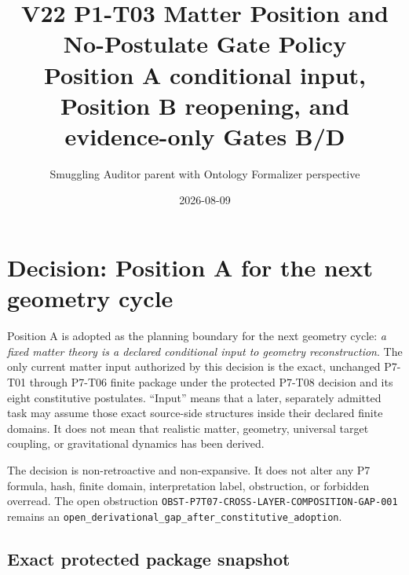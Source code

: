 \documentclass[11pt]{article}
\title{V22 P1-T03 Matter Position and No-Postulate Gate Policy\\
\large Position A conditional input, Position B reopening, and evidence-only Gates B/D}
\author{Smuggling Auditor parent with Ontology Formalizer perspective}
\date{2026-08-09}
\begin{document}
\maketitle

\begin{center}
\end{center}

\section{Decision: Position A for the next geometry cycle}

Position A is adopted as the planning boundary for the next geometry cycle:
\emph{a fixed matter theory is a declared conditional input to geometry
reconstruction}. The only current matter input authorized by this decision is
the exact, unchanged P7-T01 through P7-T06 finite package under the protected
P7-T08 decision and its eight constitutive postulates. ``Input'' means that a
later, separately admitted task may assume those exact source-side structures
inside their declared finite domains. It does not mean that realistic matter,
geometry, universal target coupling, or gravitational dynamics has been
derived.

The decision is non-retroactive and non-expansive. It does not alter any P7
formula, hash, finite domain, interpretation label, obstruction, or forbidden
overread. The open obstruction
\texttt{OBST-P7T07-CROSS-LAYER-COMPOSITION-GAP-001} remains an
\texttt{open\_derivational\_gap\_after\_constitutive\_adoption}.

\subsection{Exact protected package snapshot}
\end{document}
